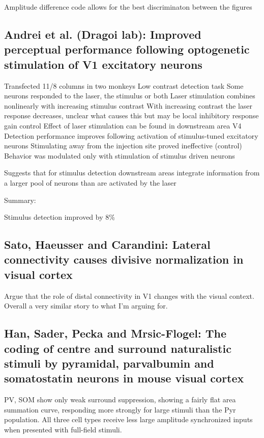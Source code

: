 \documentclass[11pt]{Science}
\begin{document}
Amplitude difference code allows for the best discriminaton between the figures

\subsection{Andrei et al. (Dragoi lab): Improved perceptual performance following optogenetic stimulation of V1 excitatory neurons}
\label{sec-2.2}


Transfected 11/8 columns in two monkeys
Low contrast detection task
Some neurons responded to the laser, the stimulus or both
Laser stimulation combines nonlinearly with increasing stimulus contrast
With increasing contrast the laser response decreases, unclear what causes this but may be local inhibitory response gain control
Effect of laser stimulation can be found in downstream area V4
Detection performance improves following activation of stimulus-tuned excitatory neurons
Stimulating away from the injection site proved ineffective (control)
Behavior was modulated only with stimulation of stimulus driven neurons

Suggests that for stimulus detection downstream areas integrate information from a larger pool of neurons than are activated by the laser

Summary:

Stimulus detection improved by 8\%

\subsection{Sato, Haeusser and Carandini: Lateral connectivity causes divisive normalization in visual cortex}
\label{sec-2.3}


Argue that the role of distal connectivity in V1 changes with the visual context. Overall a very similar story to what I'm arguing for.

\subsection{Han, Sader, Pecka and Mrsic-Flogel: The coding of centre and surround naturalistic stimuli by pyramidal, parvalbumin and somatostatin neurons in mouse visual cortex}
\label{sec-2.4}


PV, SOM show only weak surround suppression, showing a fairly flat area summation curve, responding more strongly for large stimuli than the Pyr population.
All three cell types receive less large amplitude synchronized inputs when presented with full-field stimuli.
\end{document}
